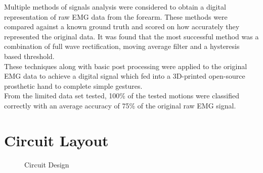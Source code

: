 \documentclass[12pt,openany,a4paper]{book}
\begin{document}
Multiple methods of signals analysis were considered to obtain a digital representation of raw EMG data from the forearm. These methods were  compared against a known ground truth and scored on how accurately they represented the original data. It was found that the most successful method was a combination of full wave rectification, moving average filter and a hysteresis based threshold.\\

These techniques along with basic post processing were applied to the original EMG data to achieve a digital signal which fed into a 3D-printed open-source prosthetic hand to complete simple gestures.\\

From the limited data set tested, 100\% of the tested motions were classified correctly with an average accuracy of 75\% of the original raw EMG signal.  

\cleardoublepage

\tableofcontents

\listoffigures
{}

\listoftables
{}

%


\cleardoublepage



\mainmatter
\setlength{\parindent}{0cm}















\appendix
\newpage
{}
\mbox{}
\newpage


\chapter{Circuit Layout}\label{app:circuit}
\begin{figure}[!ht]
\centering
\caption{Circuit Design}
\label{fig: Circuit Design}
\end{figure}

\end{document}
